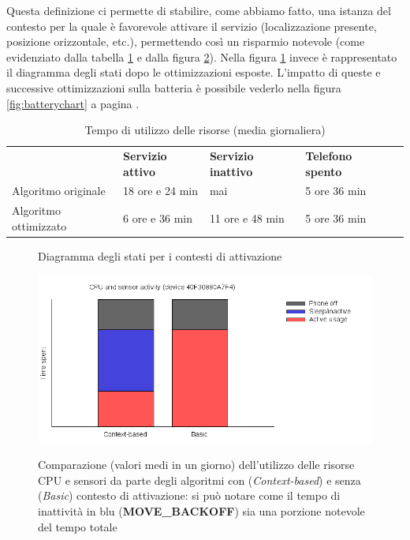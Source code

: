 \documentclass[a4paper,10pt]{memoir}
\begin{document}
Questa definizione ci permette di stabilire, come abbiamo fatto, una istanza del contesto per la quale è favorevole attivare il servizio (localizzazione presente, posizione orizzontale, etc.), permettendo così un risparmio notevole (come evidenziato dalla tabella \ref{table:tempoutilizzo} e dalla figura \ref{fig:usagechart}). Nella figura \ref{fig:scs_sm3} invece è rappresentato il diagramma degli stati dopo le ottimizzazioni esposte. L'impatto di queste e successive ottimizzazioni sulla batteria è possibile vederlo nella figura \ref{fig:batterychart} a pagina \pageref{fig:batterychart}.

\begin{table}[h]
\centering
\caption{Tempo di utilizzo delle risorse (media giornaliera)}
\label{table:tempoutilizzo}
\begin{tabular}{lllll}
& \textbf{Servizio attivo} & \textbf{Servizio inattivo} & \textbf{Telefono spento} &  \\
Algoritmo originale   & 18 ore e 24 min  & mai              & 5 ore 36 min &  \\
Algoritmo ottimizzato & 6 ore e 36 min   & 11 ore e 48 min  & 5 ore 36 min &
\end{tabular}
\end{table}

\begin{figure}[ht]
\centering
\caption{Diagramma degli stati per i contesti di attivazione}
\label{fig:scs_sm3}
\end{figure}

\begin{figure}[ht]
\centering
\caption{Comparazione (valori medi in un giorno) dell'utilizzo delle risorse CPU e sensori da parte degli algoritmi con (\textit{Context-based}) e senza (\textit{Basic}) contesto di attivazione: si può notare come il tempo di inattività in blu (\textbf{MOVE\_BACKOFF}) sia una porzione notevole del tempo totale}
\includegraphics[width=\textwidth]{database/usageplot}
\label{fig:usagechart}
\end{figure}
\end{document}
